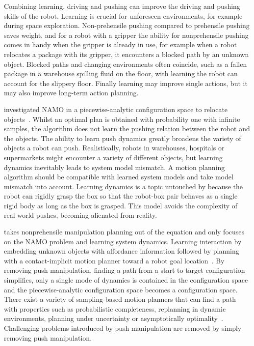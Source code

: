 Combining learning, driving and pushing can improve the driving and pushing skills of the robot. Learning is crucial for unforeseen environments, for example during space exploration. Non-prehensile pushing compared to prehensile pushing saves weight, and for a robot with a gripper the ability for nonprehensile pushing comes in handy when the gripper is already in use, for example when a robot relocates a package with its gripper, it encounters a blocked path by an unknown object. Blocked paths and changing environments often coincide, such as a fallen package in a warehouse spilling fluid on the floor, with learning the robot can account for the slippery floor. Finally learning may improve single actions, but it may also improve long-term action planning.\bs
{}

\citeauthor{vega-brown_asymptotically_2020} investigated \ac{NAMO} in a piecewise-analytic configuration space to relocate objects~\cite{vega-brown_asymptotically_2020}. Whilst an optimal plan is obtained with probability one with infinite samples, the algorithm does not learn the pushing relation between the robot and the objects. The ability to learn push dynamics greatly broadens the variety of objects a robot can push. Realistically, robots in warehouses, hospitals or supermarkets might encounter a variety of different objects, but learning dynamics inevitably leads to system model mismatch. A motion planning algorithm should be compatible with learned system models and take model mismatch into account. Learning dynamics is a topic untouched by \citeauthor{vega-brown_asymptotically_2020} because the robot can rigidly grasp the box so that the robot-box pair behaves as a single rigid body as long as the box is grasped. This model avoids the complexity of real-world pushes, becoming alienated from reality.\bs

\citeauthor{wang_affordancebased_2020} takes nonprehensile manipulation planning out of the equation and only focuses on the \ac{NAMO} problem and learning system dynamics. Learning interaction by embedding unknown objects with affordance information followed by planning with a contact-implicit motion planner toward a robot goal location~\cite{wang_affordancebased_2020}. By removing push manipulation, finding a path from a start to target configuration simplifies, only a single mode of dynamics is contained in the configuration space and the piecewise-analytic configuration space becomes a configuration space. There exist a variety of sampling-based motion planners that can find a path with properties such as probabilistic completeness, replanning in dynamic environments, planning under uncertainty or asymptotically optimality~\cite{karaman_samplingbased_2011,elbanhawi_samplingbased_2014}. Challenging problems introduced by push manipulation are removed by simply removing push manipulation.\bs

